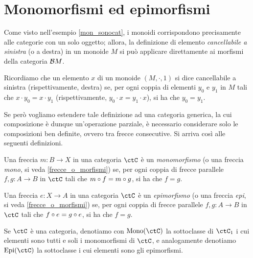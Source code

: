 \section{Monomorfismi ed epimorfismi}\label{sec_monoepi}

Come visto nell'esempio \ref{mon_sonocat}, i monoidi corrispondono precisamente alle categorie con un solo oggetto; allora,
la definizione di elemento \emph{cancellabile a sinistra} (o a destra) in un monoide \(M\) si può applicare direttamente ai morfismi della categoria \(\mathcal{B} M\).
\begin{definition}\label{def_elem_cancel}
	Ricordiamo che un elemento \(x\) di un monoide \((M, \cdot, 1)\) si dice cancellabile a sinistra (rispettivamente, destra) se,	per ogni coppia di elementi \(y_0\) e \(y_1\) in \(M\) tali che \(x \cdot y_0 = x \cdot y_1\) (rispettivamente, \(y_0 \cdot x = y_1 \cdot x\)), si ha che \(y_0 = y_1\).
\end{definition}
Se però vogliamo estendere tale definizione ad una categoria generica, la cui composizione è dunque un'operazione parziale, è necessario considerare solo le composizioni ben definite, ovvero tra frecce consecutive. Si arriva così alle seguenti definizioni.
\begin{definition}[Monomorfismo]\label{def_Mono}
	Una freccia \(m \colon B \to X\) in una categoria \(\ctC\) è un \emph{monomorfismo} (o una freccia \emph{mono}, si veda \ref{frecce_o_morfismi}) se,	per ogni coppia di frecce parallele \(f, g \colon A \to B\) in \(\ctC\) tali che \(m \circ f = m \circ g\), si ha che \(f = g\).
\end{definition}
\begin{definition}[Epimorfismo]\label{def_Epi}
	Una freccia \(e \colon X \to A\) in una categoria \(\ctC\) è un \emph{epimorfismo} (o una freccia \emph{epi}, si veda \ref{frecce_o_morfismi}) se,	per ogni coppia di frecce parallele \(f, g \colon A \to B\) in \(\ctC\) tali che \(f \circ e = g \circ e\), si ha che \(f = g\).
\end{definition}
\begin{notation}\label{notaz_monoC_epiC}
	Se \(\ctC\) è una categoria, denotiamo con \(\Mono[\ctC]\) la sottoclasse di \(\ctC_1\) i cui elementi sono tutti e soli i monomorfismi di \(\ctC\), e analogamente denotiamo \(\Epi[\ctC]\) la sottoclasse i cui elementi sono gli epimorfismi.
\end{notation}
